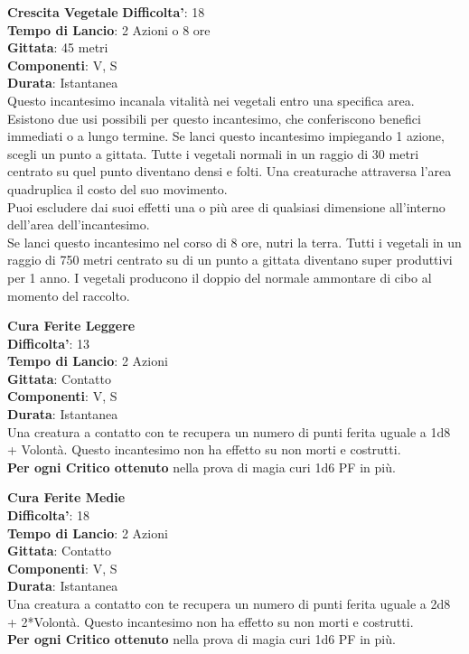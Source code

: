 \begin{multicols}{2}
\medskip\textbf{Crescita Vegetale}
\textbf{Difficolta'}: 18\\
\textbf{Tempo di Lancio}: 2 Azioni o 8 ore\\
\textbf{Gittata}: 45 metri\\
\textbf{Componenti}: V, S\\
\textbf{Durata}: Istantanea\\
Questo incantesimo incanala vitalità nei vegetali entro una specifica area. Esistono due usi possibili per questo incantesimo, che conferiscono benefici immediati o a lungo termine. Se lanci questo incantesimo impiegando 1 azione, scegli un punto a gittata. Tutte i vegetali normali in un  raggio di 30 metri centrato su quel punto diventano densi e folti. Una creaturache attraversa l’area quadruplica il costo del suo movimento.\\
Puoi escludere dai suoi effetti una o più aree di qualsiasi dimensione all’interno dell’area dell’incantesimo.\\
Se lanci questo incantesimo nel corso di 8 ore, nutri la terra. Tutti i vegetali in un raggio di 750 metri centrato su di un punto a gittata diventano super produttivi per 1 anno. I vegetali producono il doppio del normale ammontare di cibo al momento del raccolto.

\medskip\textbf{Cura Ferite Leggere}\\
\textbf{Difficolta'}: 13\\
\textbf{Tempo di Lancio}: 2 Azioni\\
\textbf{Gittata}: Contatto\\
\textbf{Componenti}: V, S\\
\textbf{Durata}: Istantanea\\
Una creatura a contatto con te recupera un numero di punti ferita uguale a 1d8 + Volontà. Questo incantesimo non ha effetto su non morti e costrutti.\\
\textbf{Per ogni Critico ottenuto} nella prova di magia curi 1d6 PF in più.

\medskip\textbf{Cura Ferite Medie}\\
\textbf{Difficolta'}: 18\\
\textbf{Tempo di Lancio}: 2 Azioni\\
\textbf{Gittata}: Contatto\\
\textbf{Componenti}: V, S\\
\textbf{Durata}: Istantanea\\
Una creatura a contatto con te recupera un numero di punti ferita uguale a 2d8 + 2*Volontà. Questo incantesimo non ha effetto su non morti e costrutti.\\
\textbf{Per ogni Critico ottenuto} nella prova di magia curi 1d6 PF in più.


\end{multicols}
